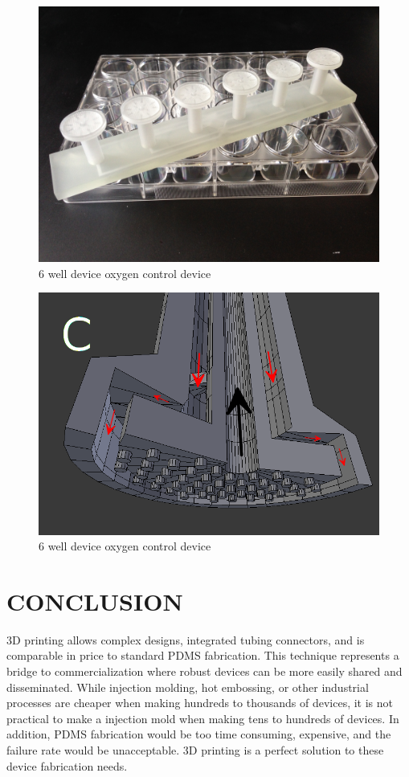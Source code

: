 \documentclass{article}
\begin{document}
\begin{figure}[h!]
\centering
\includegraphics[scale=0.2]{6-well.JPG}
\caption{6 well device oxygen control device}
\label{fig:6-well-photo}
\end{figure}

\begin{figure}[h!]
\centering
\includegraphics[scale=0.2]{6well-render.png}
\caption{6 well device oxygen control device}
\label{fig:6well-render}
\end{figure}

\section{CONCLUSION}

3D printing allows complex designs, integrated tubing connectors, and is comparable in price to standard PDMS fabrication.
This technique represents a bridge to commercialization where robust devices can be more easily shared and disseminated.
While injection molding, hot embossing, or other industrial processes are cheaper when making hundreds to thousands of devices, it is not practical to make a injection mold when making tens to hundreds of devices.
In addition, PDMS fabrication would be too time consuming, expensive, and the failure rate would be unacceptable.
3D printing is a perfect solution to these device fabrication needs.



\end{document}
